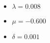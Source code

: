 
\begin{itemize}
    \item $\lambda = 0.008$
    \item $\mu = -0.600$
    \item $\delta = 0.001$
\end{itemize}
